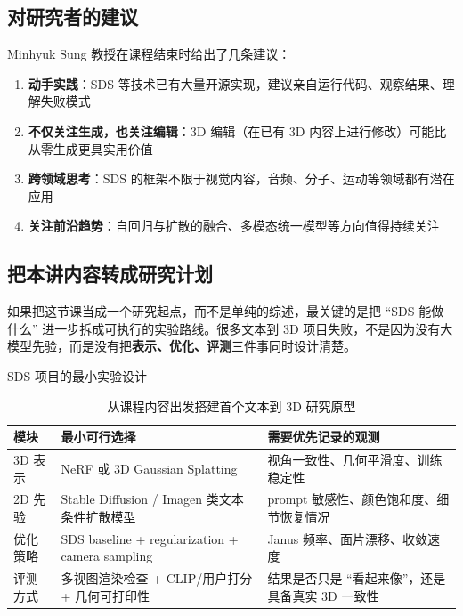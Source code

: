 \subsection{对研究者的建议}

Minhyuk Sung 教授在课程结束时给出了几条建议：

\begin{enumerate}
    \item \textbf{动手实践}：SDS 等技术已有大量开源实现，建议亲自运行代码、观察结果、理解失败模式
    \item \textbf{不仅关注生成，也关注编辑}：3D 编辑（在已有 3D 内容上进行修改）可能比从零生成更具实用价值
    \item \textbf{跨领域思考}：SDS 的框架不限于视觉内容，音频、分子、运动等领域都有潜在应用
    \item \textbf{关注前沿趋势}：自回归与扩散的融合、多模态统一模型等方向值得持续关注
\end{enumerate}

\subsection{把本讲内容转成研究计划}

如果把这节课当成一个研究起点，而不是单纯的综述，最关键的是把 ``SDS 能做什么'' 进一步拆成可执行的实验路线。很多文本到 3D 项目失败，不是因为没有大模型先验，而是没有把\textbf{表示、优化、评测}三件事同时设计清楚。

\begin{knowledgebox}{SDS 项目的最小实验设计}
\begin{table}[H]
\centering
\begin{tabular}{p{} p{} p{}}
\toprule
模块 & 最小可行选择 & 需要优先记录的观测 \\
\midrule
3D 表示 & NeRF 或 3D Gaussian Splatting & 视角一致性、几何平滑度、训练稳定性 \\
2D 先验 & Stable Diffusion / Imagen 类文本条件扩散模型 & prompt 敏感性、颜色饱和度、细节恢复情况 \\
优化策略 & SDS baseline + regularization + camera sampling & Janus 频率、面片漂移、收敛速度 \\
评测方式 & 多视图渲染检查 + CLIP/用户打分 + 几何可打印性 & 结果是否只是 ``看起来像''，还是具备真实 3D 一致性 \\
\bottomrule
\end{tabular}
\caption{从课程内容出发搭建首个文本到 3D 研究原型}
\end{table}
\end{knowledgebox}

